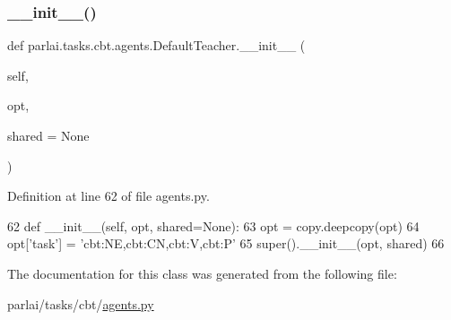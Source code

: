 \subsubsection{\texorpdfstring{\+\_\+\+\_\+init\+\_\+\+\_\+()}{\_\_init\_\_()}}
{\footnotesize\ttfamily def parlai.\+tasks.\+cbt.\+agents.\+Default\+Teacher.\+\_\+\+\_\+init\+\_\+\+\_\+ (\begin{DoxyParamCaption}\item[{}]{self,  }\item[{}]{opt,  }\item[{}]{shared = {\ttfamily None} }\end{DoxyParamCaption})}



Definition at line 62 of file agents.\+py.


\begin{DoxyCode}
62     \textcolor{keyword}{def }\_\_init\_\_(self, opt, shared=None):
63         opt = copy.deepcopy(opt)
64         opt[\textcolor{stringliteral}{'task'}] = \textcolor{stringliteral}{'cbt:NE,cbt:CN,cbt:V,cbt:P'}
65         super().\_\_init\_\_(opt, shared)
66 \end{DoxyCode}


The documentation for this class was generated from the following file\+:\begin{DoxyCompactItemize}
\item 
parlai/tasks/cbt/\hyperlink{parlai_2tasks_2cbt_2agents_8py}{agents.\+py}\end{DoxyCompactItemize}
